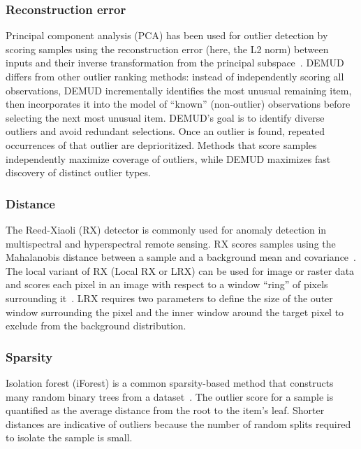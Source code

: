 \documentclass[utf8]{frontiersFPHY} %
\begin{document}
\subsubsection{Reconstruction error}
Principal component analysis (PCA) has been used for outlier detection by
scoring samples using the reconstruction error (here, the L2 norm)
between inputs and their inverse
transformation from the principal subspace~\citep{kerner2020comparison}.
DEMUD~\citep{wagstaff:demud13} differs from other
outlier ranking methods: instead of independently scoring all
observations, DEMUD incrementally identifies the most unusual
remaining item, then incorporates it into the model of ``known''
(non-outlier) observations before selecting the next most unusual
item.  DEMUD's goal is to identify diverse outliers and avoid
redundant selections.  Once an outlier is found, repeated
occurrences of that outlier are deprioritized.  Methods that score
samples independently maximize coverage of outliers, while DEMUD
maximizes fast discovery of distinct outlier types.

\subsubsection{Distance}
The 
Reed-Xiaoli (RX) detector is commonly used for anomaly detection in
multispectral and hyperspectral remote sensing. RX scores samples using
the Mahalanobis
distance between a sample and a background mean and 
covariance~\citep{reed1990adaptive}. The local variant of RX (Local
RX or LRX) can be used for image or raster data and scores each pixel in
an image with respect to a window ``ring'' of pixels surrounding 
it~\citep{molero2013analysis}. 
LRX requires two parameters to define the size of the outer window 
surrounding the pixel and the inner window
around the target pixel to exclude from the background distribution. 

\subsubsection{Sparsity}
Isolation forest (iForest) is a common sparsity-based method
that constructs many random binary trees from a 
dataset~\cite{liu2008isolation}. The outlier score for
a sample is quantified as the average distance from the root to the item’s 
leaf. Shorter distances are indicative of outliers because the number
of random splits required to isolate the sample is small.
\end{document}
